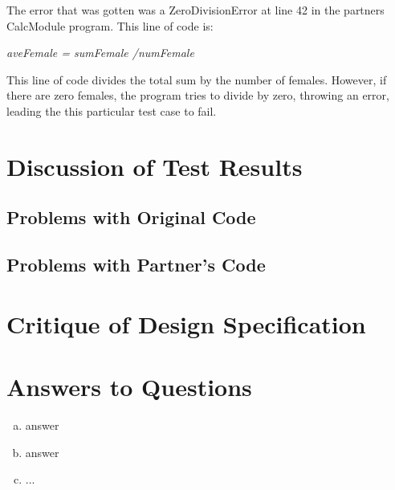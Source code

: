 \documentclass[12pt]{article}
\begin{document}
The error that was gotten was a ZeroDivisionError at line 42 in the partners
CalcModule program. This line of code is:

\centerline{\textit{aveFemale = sumFemale /numFemale}}

This line of code divides the total sum by the number of females. However, if there
are zero females, the program tries to divide by zero, throwing an error, leading
the this particular test case to fail.


\section{Discussion of Test Results}

\subsection{Problems with Original Code}

\subsection{Problems with Partner's Code}

\section{Critique of Design Specification}


\section{Answers to Questions}

\begin{enumerate}[(a)]

\item answer

\item answer

\item ...

\end{enumerate}

\newpage

\lstset{language=Python, basicstyle=\tiny, breaklines=true, showspaces=false,
  showstringspaces=false, breakatwhitespace=true}

\def\thesection{\Alph{section}}
\end{document}
